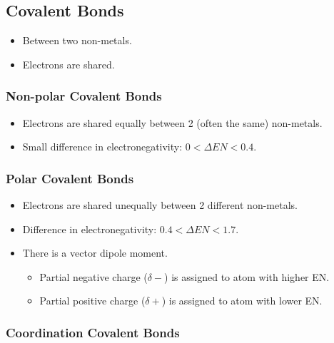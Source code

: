 \documentclass{article}
\begin{document}
\subsection{Covalent Bonds}

\begin{itemize}
    \item Between two non-metals.
    \item Electrons are shared.
\end{itemize}

\subsubsection{Non-polar Covalent Bonds}

\begin{itemize}
    \item Electrons are shared equally between 2 (often the same) non-metals.
    \item Small difference in electronegativity: $0 < \Delta EN < 0.4$.
\end{itemize}

\subsubsection{Polar Covalent Bonds}

\begin{itemize}
    \item Electrons are shared unequally between 2 different non-metals.
    \item Difference in electronegativity: $0.4 < \Delta EN < 1.7$.
    \item There is a vector dipole moment.
    \begin{itemize}
        \item Partial negative charge ($\delta -$) is assigned to atom with higher EN.
        \item Partial positive charge ($\delta +$) is assigned to atom with lower EN.
    \end{itemize}
\end{itemize}

\begin{center}
\end{center}

\subsubsection{Coordination Covalent Bonds}
\end{document}
